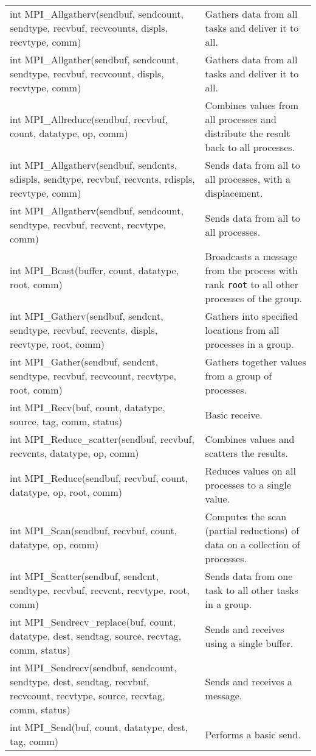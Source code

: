 \documentclass[10pt,a4paper]{article}
\begin{document}
\begin{tabularx}{\textwidth}{|>{\ttfamily}X|X|} \hline
  \multicolumn{2}{|c|}{\bf ~Jean Niklas L'orange \hfill MPI Cheatsheet~~}%
  \\ \hline
  int MPI\_Allgatherv(sendbuf, sendcount, sendtype, recvbuf, recvcounts, displs,
  recvtype, comm) & Gathers data from all tasks and deliver it to all.
  \\ \hline
  int MPI\_Allgather(sendbuf, sendcount, sendtype, recvbuf, recvcount, displs,
  recvtype, comm) & Gathers data from all tasks and deliver it to all.
  \\ \hline
  int MPI\_Allreduce(sendbuf, recvbuf, count, datatype, op, comm) & Combines
  values from all processes and distribute the result back to all processes.
  \\ \hline
  int MPI\_Allgatherv(sendbuf, sendcnts, sdispls, sendtype, recvbuf, recvcnts,
  rdispls, recvtype, comm) & Sends data from all to all processes, with a
  displacement.
  \\ \hline
  int MPI\_Allgatherv(sendbuf, sendcount, sendtype, recvbuf, recvcnt,
  recvtype, comm) & Sends data from all to all processes.
  \\ \hline
  int MPI\_Bcast(buffer, count, datatype, root, comm) & Broadcasts a message
  from the process with rank {\tt root} to all other processes of the group.
  \\ \hline
  int MPI\_Gatherv(sendbuf, sendcnt, sendtype, recvbuf, recvcnts, displs,
  recvtype, root, comm) & Gathers into specified locations from all processes
  in a group.
  \\ \hline
  int MPI\_Gather(sendbuf, sendcnt, sendtype, recvbuf, recvcount, recvtype,
  root, comm) & Gathers together values from a group of processes.
  \\ \hline
  int MPI\_Recv(buf, count, datatype, source, tag, comm, status) & Basic receive.
  \\ \hline
  int MPI\_Reduce\_scatter(sendbuf, recvbuf, recvcnts, datatype, op, comm) &
  Combines values and scatters the results.
  \\ \hline
  int MPI\_Reduce(sendbuf, recvbuf, count, datatype, op, root, comm) &
  Reduces values on all processes to a single value.
  \\ \hline
  int MPI\_Scan(sendbuf, recvbuf, count, datatype, op, comm) &
  Computes the scan (partial reductions) of data on a collection of processes.
  \\ \hline
  int MPI\_Scatter(sendbuf, sendcnt, sendtype, recvbuf, recvcnt, recvtype, root,
  comm) & Sends data from one task to all other tasks in a group.
  \\ \hline
  int MPI\_Sendrecv\_replace(buf, count, datatype, dest, sendtag, source,
  recvtag, comm, status) & Sends and receives using a single buffer.
  \\ \hline
  int MPI\_Sendrecv(sendbuf, sendcount, sendtype, dest, sendtag, recvbuf,
  recvcount, recvtype, source, recvtag, comm, status) & Sends and receives a
  message.
  \\ \hline
  int MPI\_Send(buf, count, datatype, dest, tag, comm) & Performs a basic send.
  \\ \hline
\end{tabularx}
\end{document}
